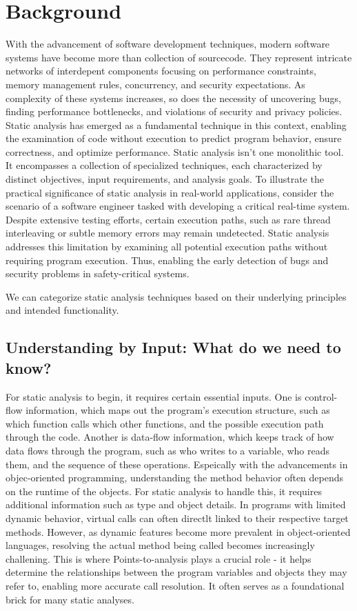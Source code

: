 \section{Background}
With the advancement of software development techniques, modern software systems have become more than collection of sourcecode. They represent intricate networks of interdepent components focusing on performance constraints, 
memory management rules, concurrency, and security expectations. As complexity of these systems increases, so does the necessity of uncovering bugs, finding performance bottlenecks, and violations of security and privacy policies.
Static analysis has emerged  as a fundamental technique in this context, enabling the examination of code without execution to predict program behavior, ensure correctness, and optimize performance.
Static analysis isn't one monolithic tool. It encompasses a collection of specialized techniques, each characterized by distinct objectives, input requirements, and analysis goals.
To illustrate the practical significance of static analysis in real-world applications, consider the scenario of a software engineer tasked with developing a critical real-time system.
Despite extensive testing efforts, certain execution paths, such as rare thread interleaving or subtle memory errors may remain undetected. Static analysis addresses this limitation by examining all potential execution paths without requiring program execution.
Thus, enabling the early detection of bugs and security problems in safety-critical systems. 

We can categorize static analysis techniques based on their underlying principles and intended functionality.

\subsection{Understanding by Input: What do we need to know?}
For static analysis to begin, it requires certain essential inputs. One is control-flow information, which maps out the program's execution structure, such as which function calls which other functions, and the possible execution path through the code.
Another is data-flow information, which keeps track of how data flows through the program, such as who writes to a variable, who reads them, and the sequence of these operations.
Espeically with the advancements in objec-oriented programming, understanding the method behavior often depends on the runtime of the objects. For static analysis to handle this, it requires additional information such as type and object details.
In programs with limited dynamic behavior, virtual calls can often directlt linked to their respective target methods. However, as dynamic features become more prevalent in object-oriented languages, resolving the actual method being called becomes increasingly challening. 
This is where Points-to-analysis \cite{lhotak2003scaling} plays a crucial role - it helps determine the relationships between the program variables and objects they may refer to, enabling more accurate call resolution.
It often serves as a foundational brick for many static analyses.

